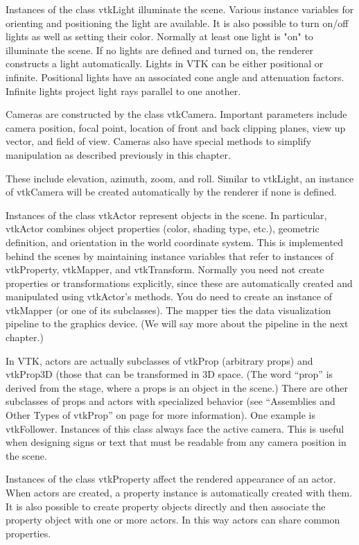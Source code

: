 Instances of the class vtkLight illuminate the scene. Various instance variables for orienting and positioning the light are available. It is also possible to turn on/off lights as well as setting their color. Normally at least one light is "on" to illuminate the scene. If no lights are defined and turned on, the renderer constructs a light automatically. Lights in VTK can be either positional or infinite. Positional lights have an associated cone angle and attenuation factors. Infinite lights project light rays parallel to one another.

Cameras are constructed by the class vtkCamera. Important parameters include camera position, focal point, location of front and back clipping planes, view up vector, and field of view. Cameras also have special methods to simplify manipulation as described previously in this chapter.

These include elevation, azimuth, zoom, and roll. Similar to vtkLight, an instance of vtkCamera will be created automatically by the renderer if none is defined.

Instances of the class vtkActor represent objects in the scene. In particular, vtkActor combines object properties (color, shading type, etc.), geometric definition, and orientation in the world coordinate system. This is implemented behind the scenes by maintaining instance variables that refer to instances of vtkProperty, vtkMapper, and vtkTransform. Normally you need not create properties or transformations explicitly, since these are automatically created and manipulated using vtkActor's methods. You do need to create an instance of vtkMapper (or one of its subclasses). The mapper ties the data visualization pipeline to the graphics device. (We will say more about the pipeline in the next chapter.)

 In VTK, actors are actually subclasses of vtkProp (arbitrary props) and vtkProp3D (those that can be transformed in 3D space. (The word ``prop'' is derived from the stage, where a props is an object in the scene.) There are other subclasses of props and actors with specialized behavior (see ``Assemblies and Other Types of vtkProp'' on page \pageref{subsubsec:assemblies_vtkprop} for more information). One example is vtkFollower. Instances of this class always face the active camera. This is useful when designing signs or text that must be readable from any camera position in the scene.

Instances of the class vtkProperty affect the rendered appearance of an actor. When actors are created, a property instance is automatically created with them. It is also possible to create property objects directly and then associate the property object with one or more actors. In this way actors can share common properties.


